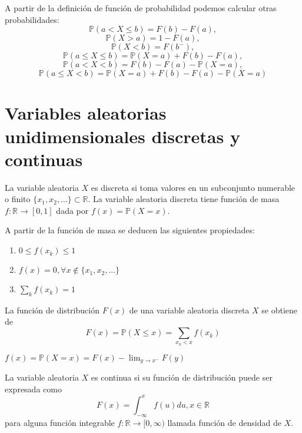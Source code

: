 \begin{obs}
A partir de la definición de función de probabilidad podemos calcular otras probabilidades:
\[ \mathbb{P}(a < X \leq b) = F(b) - F(a) ,\] \[ \mathbb{P}(X > a) = 1 - F(a) ,\] \[ \mathbb{P}(X < b) = F(b^-),\] \[ \mathbb{P}(a \leq X \leq b) = \mathbb{P}(X=a) + F(b) - F(a) ,\] \[ \mathbb{P}(a < X < b) = F(b) - F(a) - \mathbb{P}(X=a) ,\] \[ \mathbb{P}(a \leq X < b) = \mathbb{P}(X=a) + F(b) - F(a) - \mathbb{P}(X=a) \]
\end{obs}

\section{Variables aleatorias unidimensionales discretas y continuas}

\begin{defn}
La variable aleatoria $X$ es discreta si toma valores en un subconjunto numerable o finito $\{x_1,x_2,...\}\subset\mathbb{R}$. La variable aleatoria discreta tiene función de masa $f:\mathbb{R}\rightarrow[0,1]$ dada por $f(x) = \mathbb{P}(X=x)$.
\end{defn}

\begin{prop}
A partir de la función de masa se deducen las siguientes propiedades:
\begin{enumerate}[label=(\roman*)]
    \item $0\leq f(x_k)\leq 1$
    \item $f(x) = 0, \forall x \not\in\{x_1,x_2,...\}$
    \item $\sum_k f(x_k) = 1$
\end{enumerate}
La función de distribución $F(x)$ de una variable aleatoria discreta $X$ se obtiene de \[ F(x) = \mathbb{P}(X\leq x) = \sum_{x_k<x} f(x_k) \]
\end{prop}

\begin{obs}
$f(x) = \mathbb{P}(X=x)=F(x) - \lim_{y\rightarrow x^-} F(y)$
\end{obs}

\begin{defn}
La variable aleatoria $X$ es continua si su función de distribución puede ser expresada como \[ F(x) = \int_{-\infty}^x f(u)du, x\in\mathbb{R} \] para alguna función integrable $f:\mathbb{R}\rightarrow[0,\infty)$ llamada función de densidad de $X$.
\end{defn}

